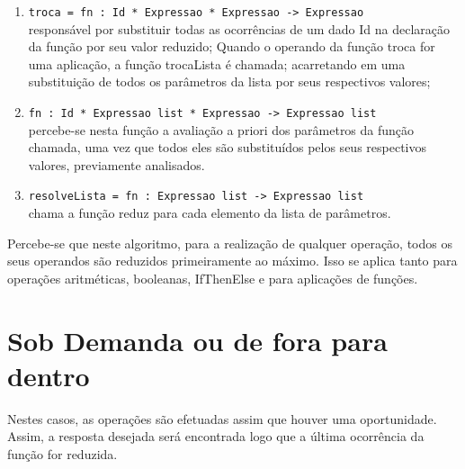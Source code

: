 \documentclass[brazil,times]{abnt}
\begin{document}
\begin{enumerate}
     \item \texttt{troca = fn : Id * Expressao * Expressao -> Expressao} \\ responsável por substituir todas as ocorrências de um dado Id na declaração da função por seu valor reduzido;
     Quando o operando da função troca for uma aplicação, a função trocaLista é chamada; acarretando em uma substituição de todos os parâmetros da lista por seus respectivos valores;
     
     \item \texttt{fn : Id * Expressao list * Expressao -> Expressao list} \\ percebe-se nesta função a avaliação a priori dos parâmetros da função chamada, uma vez que todos eles são substituídos pelos seus respectivos valores, previamente analisados.
     
     \item \texttt{resolveLista = fn : Expressao list -> Expressao list} \\ chama a função reduz para cada elemento da lista de parâmetros.
     
\end{enumerate}
Percebe-se que neste algoritmo, para a realização de qualquer operação, todos os seus operandos são reduzidos primeiramente ao máximo. Isso se aplica tanto para operações aritméticas, booleanas, IfThenElse e para aplicações de funções.



\section{Sob Demanda ou de fora para dentro}
Nestes casos, as operações são efetuadas assim que houver uma oportunidade. Assim, a resposta desejada será encontrada logo que a última ocorrência da função for reduzida.
\end{document}
